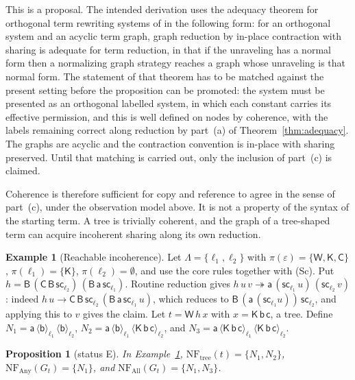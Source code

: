 \documentclass[11pt]{article}
\newtheorem{proposition}[theorem]{Proposition}
\theoremstyle{definition}
\newtheorem{example}[theorem]{Example}
\theoremstyle{remark}
\newcommand{\cB}{\mathsf{B}}
\newcommand{\cC}{\mathsf{C}}
\newcommand{\cK}{\mathsf{K}}
\newcommand{\cW}{\mathsf{W}}
\newcommand{\br}[2]{\langle #1\rangle_{#2}}
\newcommand{\sca}[1]{\mathsf{sc}_{#1}}
\newcommand{\red}{\twoheadrightarrow}
\newcommand{\NF}{\mathrm{NF}}
\newcommand{\Et}{status E}
\begin{document}
This is a proposal. The intended derivation uses the adequacy theorem for orthogonal term rewriting systems of \citet{kennaway1994} in the following form: for an orthogonal system and an acyclic term graph, graph reduction by in-place contraction with sharing is adequate for term reduction, in that if the unraveling has a normal form then a normalizing graph strategy reaches a graph whose unraveling is that normal form. The statement of that theorem has to be matched against the present setting before the proposition can be promoted: the system must be presented as an orthogonal labelled system, in which each constant carries its effective permission, and this is well defined on nodes by coherence, with the labels remaining correct along reduction by part~(a) of Theorem~\ref{thm:adequacy}. The graphs are acyclic and the contraction convention is in-place with sharing preserved. Until that matching is carried out, only the inclusion of part~(c) is claimed.

Coherence is therefore sufficient for copy and reference to agree in the sense of part~(c), under the observation model above. It is not a property of the syntax of the starting term. A tree is trivially coherent, and the graph of a tree-shaped term can acquire incoherent sharing along its own reduction.

\begin{example}[Reachable incoherence]\label{ex:incoherence}
Let $\Lambda=\{\ell_1,\ell_2\}$ with $\pi(\varepsilon)=\{\cW,\cK,\cC\}$, $\pi(\ell_1)=\{\cK\}$, $\pi(\ell_2)=\emptyset$, and use the core rules together with (Sc). Put $h=\cB\,(\cC\,\cB\,\sca{\ell_2})\,(\cB\,\mathsf a\,\sca{\ell_1})$. Routine reduction gives $h\,u\,v\red\mathsf a\,(\sca{\ell_1}\,u)\,(\sca{\ell_2}\,v)$: indeed $h\,u\to\cC\,\cB\,\sca{\ell_2}\,(\cB\,\mathsf a\,\sca{\ell_1}\,u)$, which reduces to $\cB\,(\mathsf a\,(\sca{\ell_1}u))\,\sca{\ell_2}$, and applying this to $v$ gives the claim. Let $t=\cW\,h\,x$ with $x=\cK\,\mathsf b\,\mathsf c$, a tree. Define $N_1=\mathsf a\,\br{\mathsf b}{\ell_1}\,\br{\mathsf b}{\ell_2}$, $N_2=\mathsf a\,\br{\mathsf b}{\ell_1}\,\br{\cK\,\mathsf b\,\mathsf c}{\ell_2}$, and $N_3=\mathsf a\,\br{\cK\,\mathsf b\,\mathsf c}{\ell_1}\,\br{\cK\,\mathsf b\,\mathsf c}{\ell_2}$.
\end{example}

\begin{proposition}[\Et]\label{prop:three}
In Example~\ref{ex:incoherence}, $\NF_{\mathrm{tree}}(t)=\{N_1,N_2\}$, $\NF_{\mathrm{Any}}(G_t)=\{N_1\}$, and $\NF_{\mathrm{All}}(G_t)=\{N_1,N_3\}$.
\end{proposition}
\end{document}
